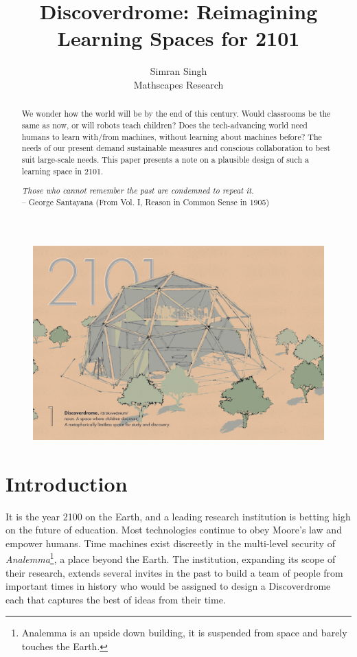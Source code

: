 \documentclass[a4paper,7pt]{article}
\date{\displaydate{date}}					%
\title{Discoverdrome: Reimagining\\ Learning Spaces for 2101}
\author{ 
	Simran Singh \\
	\small{Mathscapes Research} \\
}
\begin{document}
\maketitle
\thispagestyle{fancy}

\begin{figure}[h]
  \center
  \includegraphics[width=\textwidth]{discoverdrome_1.png}
\end{figure}


\begin{abstract}
We wonder how the world will be by the end of this century. Would classrooms be the same as now, or will robots teach children? Does the tech-advancing world need humans to learn with/from machines, without learning about machines before? The needs of our present demand sustainable measures and conscious collaboration to best suit large-scale needs. This paper presents a note on a plausible design of such a learning space in 2101.
	
	\medskip
	\begin{center}
	\textit{Those who cannot remember the past are condemned to repeat it.}
	\\\footnotesize{-- George Santayana (From Vol. I, Reason in Common Sense in 1905)}
	\end{center}
\end{abstract}

\section{Introduction}
It is the year 2100 on the Earth, and a leading research institution is betting high on the future of education. Most technologies continue to obey Moore’s law and empower humans. Time machines exist discreetly in the multi-level security of \textit{Analemma}\footnote{Analemma is an upside down building, it is suspended from space and barely touches the Earth.}, a place beyond the Earth. The institution, expanding its scope of their research, extends several invites in the past to build a team of people from important times in history who would be assigned to design a Discoverdrome each that captures the best of ideas from their time.
\end{document}
